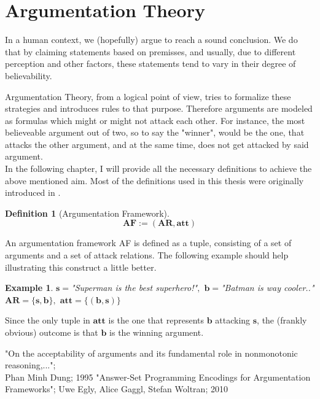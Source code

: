 \documentclass[12pt]{report}
\theoremstyle{break}
\newtheorem{defn}{Definition}[chapter]
\newtheorem{exmpl}{Example}[chapter]
\begin{document}
\section{Argumentation Theory}
In a human context, we (hopefully) argue to reach a sound conclusion. We do that by claiming statements based on premisses, and usually, due to different perception and other factors,
these statements tend to vary in their degree of believability.

Argumentation Theory, from a logical point of view, tries to formalize these strategies and introduces rules to that purpose. 
Therefore arguments are modeled as formulas which might or might not attack each other.
For instance, the most believeable argument out of two, so to say the "winner", 
would be the one, that attacks the other argument, and at the same time, does not get attacked by said argument.\\
In the following chapter, I will provide all the necessary definitions to achieve the above mentioned aim.
Most of the definitions used in this thesis were originally introduced in \cite{Dung}.

\newpage	

\begin{defn}[Argumentation Framework]
\[\bm{AF := (AR,att)}\]
\end{defn}

An argumentation framework AF is defined as a tuple, consisting of a set of arguments and a set of attack relations.
The following example should help illustrating this construct a little better.

\begin{exmpl}
$\bm{s =}$"Superman is the best superhero!"$\bm{,}$ $\bm{b =}$"Batman is way cooler.."\\
$\bm{AR = \{s,b\},}$ $\bm{att = \{(b,s)\}}$
\end{exmpl}

Since the only tuple in $\bm{att}$ is the one that represents $\bm{b}$ attacking $\bm{s}$, the (frankly obvious) outcome is that $\bm{b}$ is the winning argument.





















\begin{thebibliography}{1}
	 "On the acceptability of arguments and its fundamental role in nonmonotonic reasoning,...";\\Phan Minh Dung; 1995
	 "Answer-Set Programming Encodings for Argumentation Frameworks"; Uwe Egly, Alice Gaggl, Stefan Woltran; 2010  
\end{thebibliography}
\end{document}
